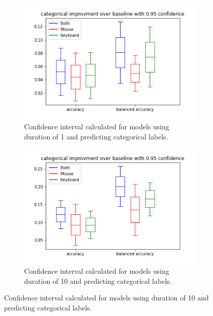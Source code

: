    \begin{figure}
        \centering
        \begin{subfigure}[b]{0.42\textwidth}
            \centering
            \includegraphics[width=\textwidth]{figures/results/1_categorical_0.95.png}
            \captionsetup{justification=centering}
            \caption{Confidence interval calculated for models using duration of 1 and predicting categorical labels.}
            \label{fig:cat_1}
        \end{subfigure}
        \hfill
        \begin{subfigure}[b]{0.42\textwidth}
            \centering
            \includegraphics[width=\textwidth]{figures/results/10_categorical_0.95.png}
            \captionsetup{justification=centering}
            \caption{Confidence interval calculated for models using duration of 10 and predicting categorical labels.}
            \label{fig:cat_10}

\end{subfigure}
\end{figure}
